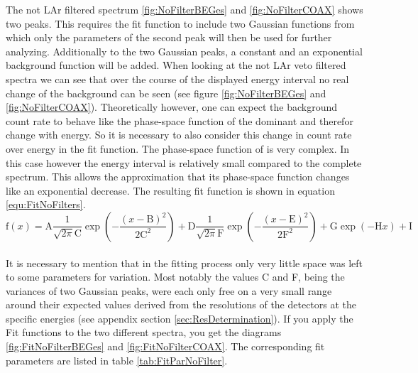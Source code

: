 \documentclass[encoding=utf8,british]{tumphthesis}
\begin{document}
The not LAr filtered spectrum \ref{fig:NoFilterBEGes} and \ref{fig:NoFilterCOAX} shows two peaks.
This requires the fit function to include two Gaussian functions from which only the parameters of the second peak will then be used for further analyzing.
Additionally to the two Gaussian peaks, a constant and an exponential background function will be added.
When looking at the not LAr veto filtered spectra we can see that over the course of the displayed energy interval no real change of the background can be seen (see figure \ref{fig:NoFilterBEGes} and \ref{fig:NoFilterCOAX}).
Theoretically however, one can expect the background count rate to behave like the phase-space function of the dominant  and therefor change with energy.
So it is necessary to also consider this change in count rate over energy in the fit function.
The phase-space function of  is very complex.
In this case however the energy interval is relatively small compared to the complete spectrum.
This allows the approximation that its phase-space function changes like an exponential decrease.
The resulting fit function is shown in equation \ref{equ:FitNoFilters}.
\\

\begin{equation}
\mathrm{f}(x) = \mathrm{A}\frac{1}{\sqrt{2\pi}\mathrm{C}}\exp\left(-\frac{(x-\mathrm{B})^2}{2\mathrm{C}^2}\right) + \mathrm{D}\frac{1}{\sqrt{2\pi}\mathrm{F}}\exp\left(-\frac{(x-\mathrm{E})^2}{2\mathrm{F}^2}\right) + \mathrm{G}\exp\left(-\mathrm{H}x\right) + \mathrm{I}
\label{equ:FitNoFilters}
\end{equation}
\\

It is necessary to mention that in the fitting process only very little space was left to some parameters for variation.
Most notably the values C and F, being the variances of two Gaussian peaks, were each only free on a very small range around their expected values derived from the resolutions of the detectors at the specific energies (see appendix section \ref{sec:ResDetermination}).
If you apply the Fit functions to the two different spectra, you get the diagrams \ref{fig:FitNoFilterBEGes} and \ref{fig:FitNoFilterCOAX}.
The corresponding fit parameters are listed in table \ref{tab:FitParNoFilter}. 
\\
\end{document}

